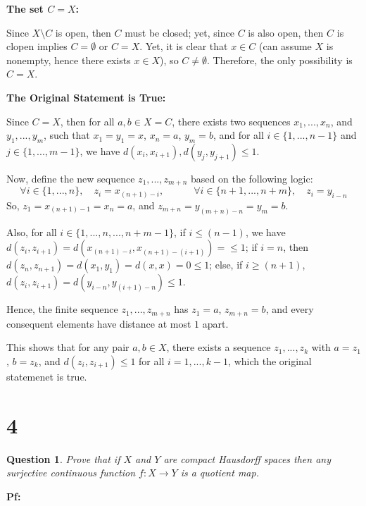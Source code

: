 \documentclass{article}
\newtheorem{question}{Question}
\begin{document}
\hfil

\textbf{The set $C=X$:}

Since $X\setminus C$ is open, then $C$ must be closed; yet, since $C$ is also open, then $C$ is clopen implies $C=\emptyset$ or $C=X$.
Yet, it is clear that $x\in C$ (can assume $X$ is nonempty, hence there exists $x\in X$), so $C\neq \emptyset$. Therefore, the only possibility is $C=X$.

\hfil

\textbf{The Original Statement is True:}

Since $C=X$, then for all $a,b\in X=C$, there exists two sequences $x_1,...,x_n$, and $y_1,...,y_m$,
such that $x_1=y_1=x$, $x_n=a$, $y_m=b$, and for all $i\in \{1,...,n-1\}$ and $j\in \{1,...,m-1\}$,
we have $d(x_i,x_{i+1}), d(y_j,y_{j+1})\leq 1$.

Now, define the new sequence $z_1,...,z_{m+n}$ based on the following logic:
$$\forall i\in \{1,...,n\},\quad z_i = x_{(n+1)-i},\quad \quad \quad \forall i\in \{n+1,...,n+m\},\quad z_i = y_{i-n}$$
So, $z_1 = x_{(n+1)-1} = x_n = a$, and $z_{m+n}= y_{(m+n)-n} = y_m = b$.

Also, for all $i\in \{1,...,n,...,n+m-1\}$, if $i\leq (n-1)$, we have $d(z_i,z_{i+1}) = d(x_{(n+1)-i},x_{(n+1)-(i+1)}) = \leq 1$;
if $i=n$, then $d(z_n,z_{n+1}) = d(x_1,y_1) = d(x,x) = 0\leq 1$; else, if $i\geq (n+1)$, $d(z_{i},z_{i+1}) = d(y_{i-n}, y_{(i+1)-n}) \leq 1$.

Hence, the finite sequence $z_1,...,z_{m+n}$ has $z_1=a$, $z_{m+n}=b$, and every consequent elements have distance at most $1$ apart.

This shows that for any pair $a,b\in X$, there exists a sequence $z_1,...,z_k$ with $a=z_1$, $b=z_k$, and $d(z_i,z_{i+1})\leq 1$ for all $i=1,...,k-1$,
which the original statemenet is true.

\hfil

\hfil

\section*{4}
\begin{myBox}[]{}
    \begin{question}
        Prove that if $X$ and $Y$ are compact Hausdorff spaces then any surjective
        continuous function $f:X\rightarrow Y$ is a quotient map.    
    \end{question}
\end{myBox}

\textbf{Pf:}
\end{document}
